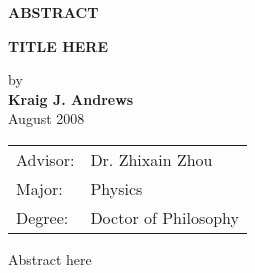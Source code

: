 \begin{center}
\textbf{ABSTRACT}
	
	
	\singlespacing
\textbf{TITLE HERE}\\
	\doublespacing
	
	by\\
	
	\textbf{Kraig J. Andrews}\\
	August 2008\\
\end{center}
\begin{tabular}{ll}	
Advisor: & Dr. Zhixain Zhou\\
Major:   &Physics\\
Degree:  &Doctor of Philosophy
\end{tabular}
\bigskip

Abstract here
